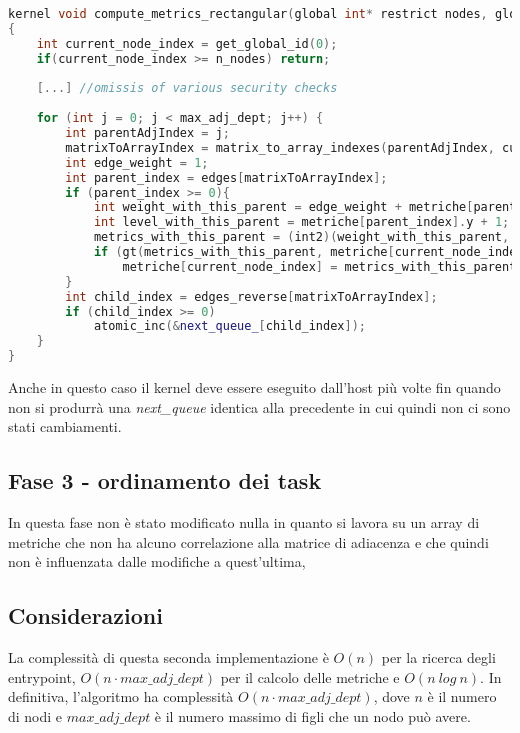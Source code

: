 \documentclass[../relazione.tex]{subfiles}
\begin{document}
\begin{lstlisting}[language=C++, caption={Compute metrics kernel II},captionpos=b]
kernel void compute_metrics_rectangular(global int* restrict nodes, global int* queue_, global int* next_queue_, const int n_nodes, global edge_t* restrict edges, global edge_t* restrict edges_reverse, volatile global int2* metriche, const int max_adj_dept)
{
	int current_node_index = get_global_id(0);
	if(current_node_index >= n_nodes) return;
	
	[...] //omissis of various security checks
	
	for (int j = 0; j < max_adj_dept; j++) {
		int parentAdjIndex = j;
		matrixToArrayIndex = matrix_to_array_indexes(parentAdjIndex, current_node_index, n_nodes);
		int edge_weight = 1;
		int parent_index = edges[matrixToArrayIndex];
		if (parent_index >= 0){
			int weight_with_this_parent = edge_weight + metriche[parent_index].x + nodes[current_node_index];
			int level_with_this_parent = metriche[parent_index].y + 1;
			metrics_with_this_parent = (int2)(weight_with_this_parent, level_with_this_parent);
			if (gt(metrics_with_this_parent, metriche[current_node_index]))
				metriche[current_node_index] = metrics_with_this_parent;
		}
		int child_index = edges_reverse[matrixToArrayIndex];
		if (child_index >= 0)
			atomic_inc(&next_queue_[child_index]);
	}
}
\end{lstlisting}

Anche in questo caso il kernel deve essere eseguito dall'host più volte fin quando non si produrrà una \textit{next\_queue} identica alla precedente in cui quindi non ci sono stati cambiamenti.

\subsection{Fase 3 - ordinamento dei task}
In questa fase non è stato modificato nulla in quanto si lavora su un array di metriche che non ha alcuno correlazione alla matrice di adiacenza e che quindi non è influenzata dalle modifiche a quest'ultima,

\subsection{Considerazioni}
La complessità di questa seconda implementazione è $O(n)$ per la ricerca degli entrypoint, $O(n \cdot max\_adj\_dept)$ per il calcolo delle metriche e $O(n\ log\ n)$.
In definitiva, l'algoritmo ha complessità $O(n \cdot max\_adj\_dept)$, dove $n$ è il numero di nodi e $max\_adj\_dept$ è il numero massimo di figli che un nodo può avere.
\end{document}
